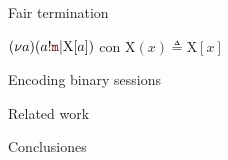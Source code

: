 \documentclass{beamer}
\newcommand{\msgtag}[1]{\texttt{\textcolor{msg-color}{#1}}}
\begin{document}
\begin{frame}{Fair termination}
    \begin{block}{}
        $(\nu a)(a!\msgtag{m} | \text{X}[a])$ con $\text{X}(x) \triangleq \text{X}[x]$
    \end{block}
    \vspace{1em}
\end{frame}

\begin{frame}{Encoding binary sessions}
\end{frame}

\begin{frame}{Related work}
\end{frame}

\begin{frame}{Conclusiones}
\end{frame}
\end{document}

